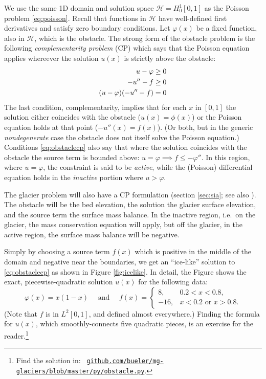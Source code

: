\documentclass[letterpaper,final,12pt,reqno]{amsart}
\numberwithin{equation}{section}
\numberwithin{figure}{section}
\numberwithin{table}{section}
\begin{document}
We use the same 1D domain and solution space $\mathcal{H}=H_0^1[0,1]$ as the Poisson problem \eqref{eq:poisson}.  Recall that functions in $\mathcal{H}$ have well-defined first derivatives and satisfy zero boundary conditions.  Let $\varphi(x)$ be a fixed function, also in $\mathcal{H}$, which is the obstacle.  The strong form of the obstacle problem is the following \emph{complementarity problem} (CP) \cite{Bueler2021,KinderlehrerStampacchia1980} which says that the Poisson equation applies whereever the solution $u(x)$ is strictly above the obstacle:
\begin{align}
  u - \varphi &\ge 0 \label{eq:obstaclecp} \\
  -u''-f &\ge 0 \notag \\
  (u-\varphi)(-u''-f) &= 0 \notag
\end{align}
The last condition, complementarity, implies that for each $x$ in $[0,1]$ the solution either coincides with the obstacle ($u(x)=\phi(x)$) or the Poisson equation holds at that point ($-u''(x)=f(x)$).  (Or both, but in the generic \emph{nondegenerate} \cite{KinderlehrerStampacchia1980} case the obstacle does not itself solve the Poisson equation.)  Conditions \eqref{eq:obstaclecp} also say that where the solution coincides with the obstacle the source term is bounded above: $u=\varphi \implies f \le -\varphi''$.  In this region, where $u=\varphi$, the constraint is said to be \emph{active}, while the (Poisson) differential equation holds in the \emph{inactive} portion where $u>\varphi$.

The glacier problem will also have a CP formulation (section \ref{sec:sia}; see also \cite{Calvoetal2002}).  The obstacle will be the bed elevation, the solution the glacier surface elevation, and the source term the surface mass balance.  In the inactive region, i.e.~on the glacier, the mass conservation equation will apply, but off the glacier, in the active region, the surface mass balance will be negative.

Simply by choosing a source term $f(x)$ which is positive in the middle of the domain and negative near the boundaries, we get an ``ice-like'' solution to \eqref{eq:obstaclecp} as shown in Figure \ref{fig:icelike}.  In detail, the Figure shows the exact, piecewise-quadratic solution $u(x)$ for the following data:
\begin{equation}
\varphi(x) = x(1-x) \quad \text{ and } \quad f(x) = \begin{cases} 8, & 0.2 < x < 0.8, \\
                                                               -16, & x<0.2 \text{ or } x>0.8. \end{cases}  \label{eq:icelikedetails}
\end{equation}
(Note that $f$ is in $L^2[0,1]$, and defined almost everywhere.)  Finding the formula for $u(x)$, which smoothly-connects five quadratic pieces, is an exercise for the reader.\footnote{Find the solution in: \, \href{https://github.com/bueler/mg-glaciers/blob/master/py/obstacle.py}{\texttt{github.com/bueler/mg-glaciers/blob/master/py/obstacle.py}}.}
\end{document}
